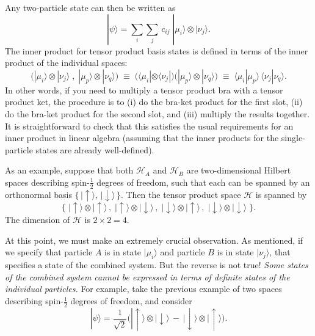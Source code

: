 \documentclass[pra,11pt]{revtex4}
\begin{document}
Any two-particle state can then be written as
$$|\psi\rangle = \sum_{i} \sum_{j} \, c_{ij}\; |\mu_i\rangle \otimes |\nu_j\rangle.$$
The inner product for tensor product basis states is defined in terms
of the inner product of the individual spaces:
$$\Big(|\mu_i\rangle \otimes |\nu_j\rangle\;,\; |\mu_p\rangle \otimes |\nu_q\rangle \Big) \;\equiv\; \big(\langle\mu_i| \otimes \langle\nu_j| \big) \big(|\mu_p\rangle \otimes |\nu_q\rangle\big) \;\equiv\; \langle\mu_i|\mu_p\rangle \, \langle\nu_j|\nu_q\rangle.$$
In other words, if you need to multiply a tensor product bra with a
tensor product ket, the procedure is to (i) do the bra-ket product for
the first slot, (ii) do the bra-ket product for the second slot, and
(iii) multiply the results together.  It is straightforward to check
that this satisfies the usual requirements for an inner product in
linear algebra (assuming that the inner products for the
single-particle states are already well-defined).

As an example, suppose that both $\mathscr{H}_A$ and $\mathscr{H}_B$
are two-dimensional Hilbert spaces describing spin-$\frac{1}{2}$
degrees of freedom, such that each can be spanned by an orthonormal basis
$\{\,|\!\uparrow\rangle, \,|\!\downarrow\rangle \, \}$.  Then the tensor
product space $\mathscr{H}$ is spanned by
$$\Big\{\;|\!\uparrow\rangle\otimes|\!\uparrow\rangle\,,\; |\!\uparrow\rangle\otimes|\!\downarrow\rangle\,,\; |\!\downarrow\rangle\otimes|\!\uparrow\rangle\,,\; |\!\downarrow\rangle\otimes|\!\downarrow\rangle \;\Big\}.$$
The dimension of $\mathscr{H}$ is $2 \times 2 = 4$.  

At this point, we must make an extremely crucial observation.  As
mentioned, if we specify that particle $A$ is in state $|\mu_i\rangle$
and particle $B$ is in state $|\nu_j\rangle$, that specifies a state
of the combined system.  But the reverse is not true!  \textit{Some
  states of the combined system cannot be expressed in terms of
  definite states of the individual particles.}  For example, take the
previous example of two spaces describing spin-$\frac{1}{2}$ degrees
of freedom, and consider
$$|\psi\rangle = \frac{1}{\sqrt{2}} \Big(|\!\uparrow\rangle\otimes|\!\downarrow\rangle \,-\, |\!\downarrow\rangle\otimes|\!\uparrow\rangle\Big).$$
\end{document}
